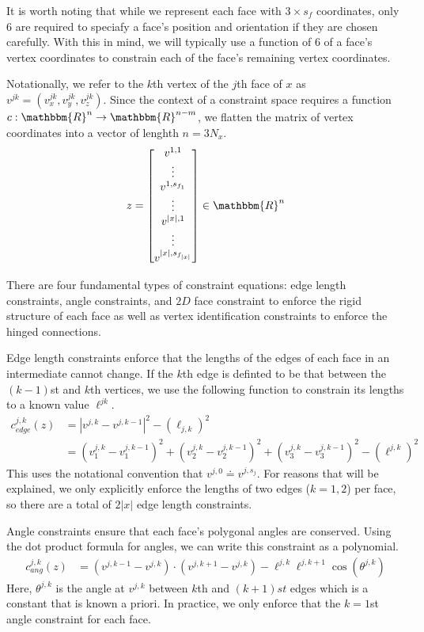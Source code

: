 It is worth noting that while we represent each face with $3\times s_f$ coordinates, only 6 are required to speciafy a face's position and orientation if they are chosen carefully. With this in mind, we will typically use a function of $6$ of a face's vertex coordinates to constrain each of the face's remaining vertex coordinates. 


Notationally, we refer to the $k$th vertex of the $j$th face of $x$ as $v^{jk} = \left(v^{jk}_x,v^{jk}_y,v^{jk}_z\right)$.
Since the context of a constraint space requires a function $c: \mathbbm{R}^n \to \mathbbm{R}^{n-m}$, we flatten the matrix of vertex coordinates into a vector of lenghth $n = 3N_x$. 
\begin{align}
z = \begin{bmatrix} v^{1,1} \\ \vdots \\ v^{1,s_{f_1}} \\ \vdots \\ v^{|x|,1} \\ \vdots \\ v^{|x|,s_{f_{|x|}}} \end{bmatrix} \in \mathbbm{R}^n
\end{align}

There are four fundamental types of constraint equations: edge length constraints, angle constraints, and $2D$ face constraint to enforce the rigid structure of each face as well as vertex identification constraints to enforce the hinged connections.

Edge length constraints enforce that the lengths of the edges of each face in an intermediate cannot change. If the $k$th edge is definted to be that between the $(k-1)$st and $k$th vertices, we use the following function to constrain its lengths to a known value $\ell^{jk}$.
\begin{align}
c_{edge}^{j,k}\left(z\right)& = \left|v^{j,k} - v^{j,k-1}\right|^2 - (\ell_{j,k})^2 \\
& = \left(v_1^{j,k} - v_1^{j,k-1}\right)^2 +\left(v_2^{j,k} - v_2^{j,k-1}\right)^2 +\left(v_3^{j,k} - v_3^{j,k-1}\right)^2 - (\ell^{j,k})^2 
\end{align}  
This uses the notational convention that $v^{j,0} \doteq v^{j,s_j}$. For reasons that will be explained, we only explicitly enforce the lengths of two edges ($k=1,2$) per face, so there are a total of $2|x|$ edge length constraints. 

Angle constraints ensure that each face's polygonal angles are conserved. Using the dot product formula for angles, we can write this constraint as a polynomial.
\begin{align}
c_{ang}^{j,k}\left(z\right) &= (v^{j,k-1} - v^{j,k})\cdot(v^{j,k+1} - v^{j,k})  - \ell^{j,k}\ell^{j,k+1}\cos(\theta^{j,k})
\end{align}  
Here, $\theta^{j,k}$ is the angle at $v^{j,k}$ between $k$th and $(k+1)st$ edges which is a constant that is known a priori. In practice, we only enforce that the $k=1$st angle constraint for each face.

